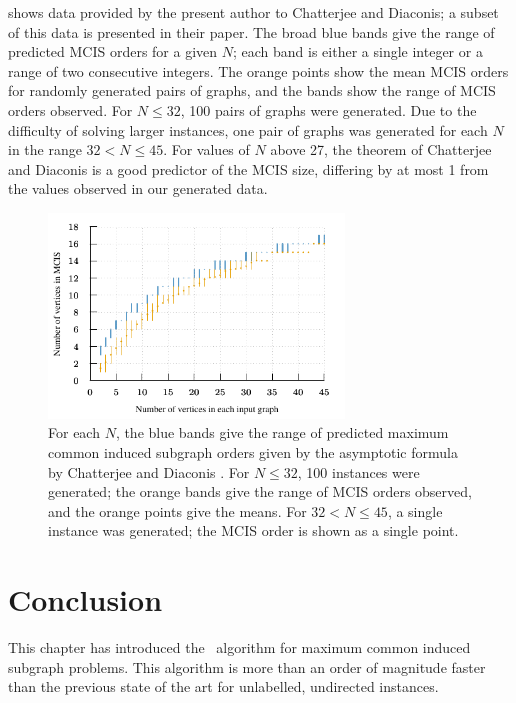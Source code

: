 shows data provided by the present author to Chatterjee and Diaconis; a subset
of this data is presented in their paper.  The broad blue bands give the
range of predicted MCIS orders for a given $N$; each band is either a single
integer or a range of two consecutive integers.  The orange points show the mean
MCIS orders for randomly generated pairs of graphs, and the bands show the
range of MCIS orders observed.  For $N \leq 32$, 100 pairs of graphs were
generated.  Due to the difficulty of solving larger instances, one pair
of graphs was generated for each $N$ in the range $32 < N \leq 45$.  For values
of $N$ above 27, the theorem of Chatterjee and Diaconis is a good predictor
of the MCIS size, differing by at most 1 from the values observed in our
generated data.

\begin{figure}[htb]
    \centering
    \includegraphics*[width=0.7\textwidth]{14-mcsplit-i-undirected/data-for-diaconis-and-chatterjee/plot}
    \caption{For each $N$, the blue bands give the range of predicted maximum
    common induced subgraph orders given by the asymptotic formula by
    Chatterjee and Diaconis \cite{chatterjee2021isomorphisms}.  For $N \leq 32$,
    100 instances were generated; the orange bands give the range of MCIS orders
    observed, and the orange points give the means.  For $32 < N \leq 45$,
    a single instance was generated; the MCIS order is shown as a single point.}
    \label{figure:mcis-order-bands}
\end{figure}

\section{Conclusion}
\label{sec:mcsplit-conclusion}

This chapter has introduced the \McSplit\ algorithm for maximum common induced subgraph
problems. This algorithm is more than an order of magnitude faster than the
previous state of the art for unlabelled, undirected instances.  

